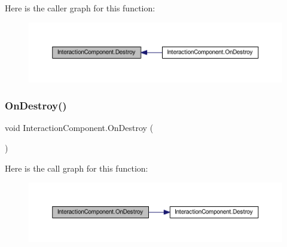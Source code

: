 Here is the caller graph for this function\+:\nopagebreak
\begin{figure}[H]
\begin{center}
\leavevmode
\includegraphics[width=350pt]{class_interaction_component_aa28f5c9f92b342c3d52f8b0b251fb4fa_icgraph}
\end{center}
\end{figure}
\mbox{\label{class_interaction_component_a3add77b0cb9df6b962ea2c66d317fa46}} 
\subsubsection{\texorpdfstring{On\+Destroy()}{OnDestroy()}}
{\footnotesize\ttfamily void Interaction\+Component.\+On\+Destroy (\begin{DoxyParamCaption}{ }\end{DoxyParamCaption})\hspace{0.3cm}{\ttfamily [private]}}

Here is the call graph for this function\+:\nopagebreak
\begin{figure}[H]
\begin{center}
\leavevmode
\includegraphics[width=350pt]{class_interaction_component_a3add77b0cb9df6b962ea2c66d317fa46_cgraph}
\end{center}
\end{figure}
\mbox{\label{class_interaction_component_a80d4c2288af453dd9611bbea092843e5}} 
